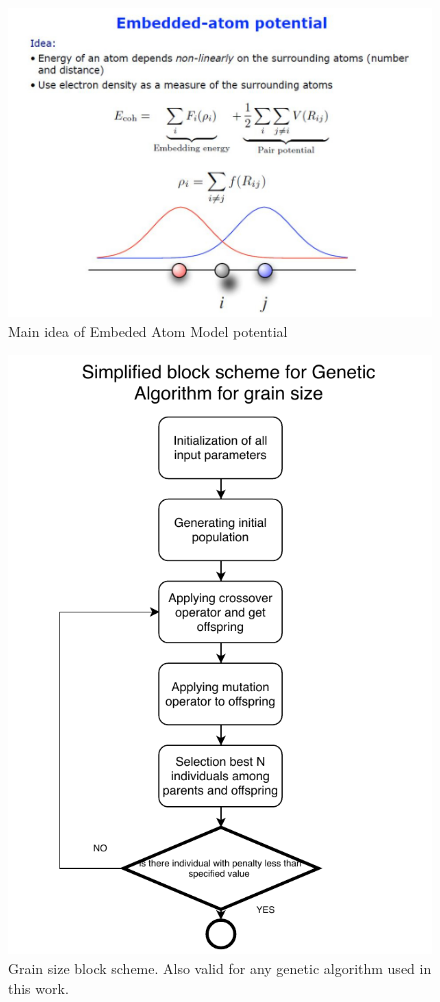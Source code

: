 \documentclass[12pt]{report}
\begin{document}
\begin{figure}
    \centering
    \includegraphics[width=5.0in]{EAM_appendix}
    \caption{Main idea of Embeded Atom Model potential}
    \label{eamappendix}
\end{figure}

\begin{figure}
    \centering
    \includegraphics[width=5.0in]{grain_size_blockscheme}
    \caption{Grain size block scheme. Also valid for any genetic algorithm used in this work.}
    \label{grainsizeblock}
\end{figure}
\end{document}
